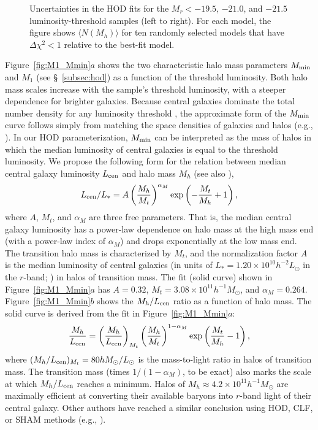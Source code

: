 \documentclass[]{emulateapj}
\def\hMsun{h^{-1}M_\odot}
\begin{document}
\begin{figure}[tbp]
\caption[]{\label{fig:Navg_curves}
Uncertainties in the HOD fits for the $M_r<-19.5$, $-21.0$, and $-21.5$
luminosity-threshold samples (left to right).  For each model,
the figure shows $\langle N(M_h) \rangle$ for ten randomly selected
models that have $\Delta\chi^2 <1$ relative to the best-fit model.
}
\end{figure}

%
Figure~\ref{fig:M1_Mmin}$a$ shows the two characteristic halo mass parameters
$M_{\rm min}$ and $M_1$ (see \S~\ref{subsec:hod}) as a 
function of the threshold
luminosity.  Both halo mass scales increase with the sample's threshold
luminosity, with a steeper dependence for brighter galaxies.
Because central galaxies dominate the total number density for any
luminosity threshold \citep{zheng05}, the approximate form of the
$M_{\rm min}$ curve follows simply from matching the space densities
of galaxies and halos (e.g., \citealt{conroy06,vale06}). In our HOD 
parameterization, $M_{\rm min}$ can be interpreted as the mass of halos in
which the median luminosity of central galaxies is equal to the threshold 
luminosity.
We propose the following form for the relation between median central 
galaxy luminosity $L_{\rm cen}$ and halo mass $M_h$ (see also \citealt{kim08}),
\begin{equation}
\label{eqn:mminl}
L_{\rm cen}/L_*
=A\left(\frac{M_h}{M_t}\right)^{\alpha_M}\exp\left(-\frac{M_t}{M_h}+1\right),
\end{equation}
where $A$, $M_t$, and $\alpha_M$ are three free parameters. That is, the 
median central galaxy luminosity has a power-law dependence on halo mass at 
the high mass end (with a power-law index of $\alpha_M$) and drops 
exponentially
at the low mass end. The transition halo mass is characterized by $M_t$, and 
the normalization factor $A$ is the median luminosity of central galaxies 
(in units of $L_*=1.20\times 10^{10}h^{-2}L_\odot$ in the $r$-band; 
\citealt{blanton03c}) in halos of transition mass. The fit (solid curve) shown 
in Figure~\ref{fig:M1_Mmin}$a$ has $A=0.32$, $M_t=3.08\times 10^{11}\hMsun$, 
and $\alpha_M=0.264$. Figure~\ref{fig:M1_Mmin}$b$ shows the $M_h/L_{\rm cen}$
ratio as a function of halo mass. The solid curve is derived from the fit in 
Figure~\ref{fig:M1_Mmin}$a$:
\begin{equation}
\label{eqn:mass_to_light}
\frac{M_h}{L_{\rm cen}}=
\left(\frac{M_h}{L_{\rm cen}}\right)_{M_t}
\left(\frac{M_h}{M_t}\right)^{1-\alpha_M}
\exp\left(\frac{M_t}{M_h}-1\right),
\end{equation}
where $(M_h/L_{\rm cen})_{M_t}=80hM_\odot/L_\odot$ is the mass-to-light ratio 
in halos of transition mass. The transition mass (times $1/(1-\alpha_M)$,
to be exact) also marks the scale at which $M_h/L_{\rm cen}$ reaches a 
minimum. Halos of $M_h \approx 4.2\times 10^{11}\hMsun$ are maximally efficient
at converting their available baryons into $r$-band light of their
central galaxy.  Other authors have reached a similar conclusion using 
HOD, CLF, or SHAM methods (e.g., 
\citealt{yang03,tinker05,vale06,zheng07,kim08,guo10,moster10}).
\end{document}
